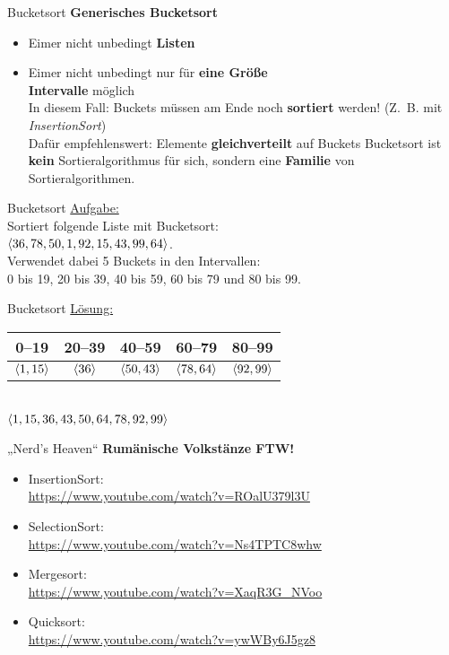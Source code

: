 \begin{frame}{Bucketsort}
	\textbf{Generisches Bucketsort} \\
	\begin{itemize}
		\item Eimer nicht unbedingt \textbf{Listen}
		\item Eimer nicht unbedingt nur für \textbf{eine Größe} \\
		\impl \textbf{Intervalle} möglich \\
		\impl In diesem Fall: Buckets müssen am Ende noch \textbf{sortiert} werden! 
		(Z.~B. mit \emph{InsertionSort}) \\
		\impl Dafür empfehlenswert: Elemente \textbf{gleichverteilt} auf Buckets
		\implitem Bucketsort ist \textbf{kein} Sortieralgorithmus für sich, sondern eine \textbf{Familie} von Sortieralgorithmen. 
	\end{itemize}
\end{frame}


\begin{frame}{Bucketsort}
	\underline{Aufgabe:} \\
	Sortiert folgende Liste mit Bucketsort: \\ $\langle 36, 78, 50, 1, 92, 15, 43, 99, 64 \rangle$. \\ 
	Verwendet dabei 5 Buckets in den Intervallen: \\
	0 bis 19, 20 bis 39, 40 bis 59, 60 bis 79 und 80 bis 99.
\end{frame}

\begin{frame}{Bucketsort}
	\underline{Lösung:} \\[0,25cm]
	\begin{tabular}{ | c | c | c | c | c | }
		0–19 & 20–39 & 40–59 & 60–79 & 80–99
		\\ \hline
		$\langle  1, 15  \rangle$ & $\langle  36  \rangle$ & $\langle  50, 43  \rangle$ & $\langle  78, 64  \rangle$ & $\langle  92, 99  \rangle$
		\\ \hline
	\end{tabular}
	\\[0,25cm]
	\impl $\langle 1, 15, 36, 43, 50, 64, 78, 92, 99 \rangle$
\end{frame}

\begin{frame}{{}„Nerd's Heaven“{}}
	\pause\pause 
	\textbf{Rumänische Volkstänze FTW!} \\
	\begin{itemize}
		\item InsertionSort: \\
		\url{https://www.youtube.com/watch?v=ROalU379l3U} 
		\item SelectionSort: \\
		\url{https://www.youtube.com/watch?v=Ns4TPTC8whw} 
		\item Mergesort: \\
		\url{https://www.youtube.com/watch?v=XaqR3G\_NVoo} 
		\item Quicksort: \\
		\url{https://www.youtube.com/watch?v=ywWBy6J5gz8} 
	\end{itemize}
	
\end{frame}


